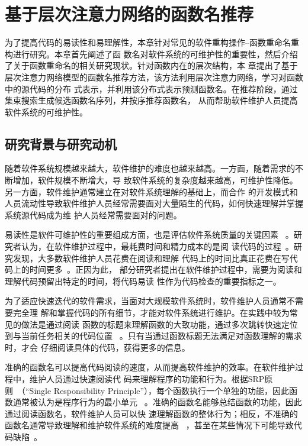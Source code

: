 
\chapter{基于层次注意力网络的函数名推荐}
为了提高代码的易读性和易理解性，本章针对常见的软件重构操作--函数重命名重构进行研究。本章首先阐述了函
数名对软件系统的可维护性的重要性，然后介绍了关于函数重命名的相关研究现状。针对函数内在的层次结构，本
章提出了基于层次注意力网络模型的函数名推荐方法，该方法利用层次注意力网络，学习对函数中的源代码的分布
式表示，并利用该分布式表示预测函数名。在推荐阶段，通过集束搜索生成候选函数名序列，并按序推荐函数名，
从而帮助软件维护人员提高软件系统的可维护性。

\section{研究背景与研究动机}
随着软件系统规模越来越大，软件维护的难度也越来越高。一方面，随着需求的不断增加，软件规模不断增大，导
致软件系统的复杂度越来越高，可维护性降低。另一方面，软件维护通常建立在对软件系统理解的基础上，而合作
的开发模式和人员流动性导致软件维护人员经常需要面对大量陌生的代码，如何快速理解并掌握系统源代码成为维
护人员经常需要面对的问题。

易读性是软件可维护性的重要组成方面，也是评估软件系统质量的关键因素
~\cite{buse2008metric}。研究者认为，在软件维护过程中，最耗费时间和精力成本的是阅
读代码的过程~\cite{rugaber2000use}。研究发现，大多数软件维护人员花费在阅读和理解
代码上的时间比真正花费在写代码上的时间更多~\cite{ko2006exploratory}。正因为此，
部分研究者提出在软件维护过程中，需要为阅读和理解代码预留出特定的时间，将代码易读
性作为代码检查的重要指标之一。

为了适应快速迭代的软件需求，当面对大规模软件系统时，软件维护人员通常不需要完全理
解和掌握代码的所有细节，才能对软件系统进行维护。在实践中较为常见的做法是通过阅读
函数的标题来理解函数的大致功能，通过多次跳转快速定位到与当前任务相关的代码位置
~\cite{starke2009searching}。只有当通过函数标题无法满足对函数理解的需求时，才会
仔细阅读具体的代码，获得更多的信息。

准确的函数名可以提高代码阅读的速度，从而提高软件维护的效率。在软件维护过程中，维护人员通过快速阅读代
码来理解程序的功能和行为。根据SRP原则~\cite{martin2003agile}（``Single Responsibility
Principle''），每个函数执行一个单独的功能，因此函数通常被认为是程序行为的最小单元
~\cite{host2009debugging}。准确的函数名能够总结函数的功能，因此通过阅读函数名，软件维护人员可以快
速理解函数的整体行为；相反，不准确的函数名通常导致理解和维护软件系统的难度提高
~\cite{arnaoudova2016linguistic}，甚至在某些情况下可能导致代码缺陷~\cite{abebe2012can}。


